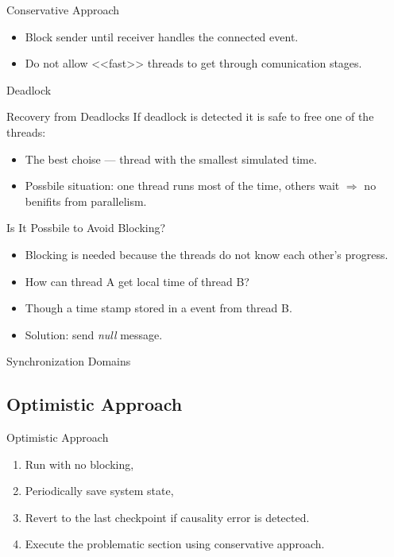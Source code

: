 \begin{frame}{Conservative Approach}
  \begin{itemize}
    \item Block sender until receiver handles the connected event.
    \item Do not allow <<fast>> threads to get through comunication stages.
  \end{itemize}
  \centering
\end{frame}

\begin{frame}{Deadlock}
  \centering
\end{frame}

\begin{frame}{Recovery from Deadlocks}
  If deadlock is detected it is safe to free one of the threads:
  \begin{itemize}
    \item The best choise --- thread with the smallest simulated time.
    \item Possbile situation: one thread runs most of the time, others wait
      $\Rightarrow$ no benifits from parallelism.
  \end{itemize}
\end{frame}

\begin{frame}{Is It Possbile to Avoid Blocking?}
  \begin{itemize}
    \item Blocking is needed because the threads do not know each other's
      progress.
    \item How can thread A get local time of thread B? \pause
    \item Though a time stamp stored in a event from thread B.
    \item Solution: send \textit{null} message.
  \end{itemize}
\end{frame}

\begin{frame}{Synchronization Domains}
  \centering
\end{frame}

\subsection{Optimistic Approach}

\begin{frame}{Optimistic Approach}
  \begin{enumerate}
    \item Run with no blocking,
    \item Periodically save system state,
    \item Revert to the last checkpoint if causality error is detected.
    \item Execute the problematic section using conservative approach.
  \end{enumerate}
\end{frame}

